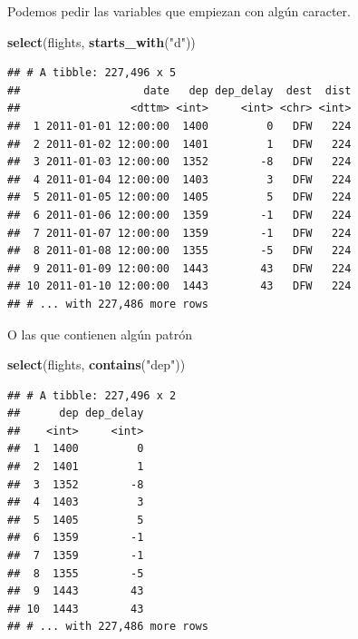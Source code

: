 \documentclass[]{article}
\newenvironment{Shaded}{\begin{snugshade}}{\end{snugshade}}
\newcommand{\KeywordTok}[1]{\textcolor[rgb]{0.13,0.29,0.53}{\textbf{#1}}}
\newcommand{\StringTok}[1]{\textcolor[rgb]{0.31,0.60,0.02}{#1}}
\newcommand{\NormalTok}[1]{#1}
\begin{document}
Podemos pedir las variables que empiezan con algún caracter.

\begin{Shaded}
\begin{Highlighting}[]
\KeywordTok{select}\NormalTok{(flights, }\KeywordTok{starts_with}\NormalTok{(}\StringTok{"d"}\NormalTok{))}
\end{Highlighting}
\end{Shaded}

\begin{verbatim}
## # A tibble: 227,496 x 5
##                   date   dep dep_delay  dest  dist
##                 <dttm> <int>     <int> <chr> <int>
##  1 2011-01-01 12:00:00  1400         0   DFW   224
##  2 2011-01-02 12:00:00  1401         1   DFW   224
##  3 2011-01-03 12:00:00  1352        -8   DFW   224
##  4 2011-01-04 12:00:00  1403         3   DFW   224
##  5 2011-01-05 12:00:00  1405         5   DFW   224
##  6 2011-01-06 12:00:00  1359        -1   DFW   224
##  7 2011-01-07 12:00:00  1359        -1   DFW   224
##  8 2011-01-08 12:00:00  1355        -5   DFW   224
##  9 2011-01-09 12:00:00  1443        43   DFW   224
## 10 2011-01-10 12:00:00  1443        43   DFW   224
## # ... with 227,486 more rows
\end{verbatim}

O las que contienen algún patrón

\begin{Shaded}
\begin{Highlighting}[]
\KeywordTok{select}\NormalTok{(flights, }\KeywordTok{contains}\NormalTok{(}\StringTok{"dep"}\NormalTok{))}
\end{Highlighting}
\end{Shaded}

\begin{verbatim}
## # A tibble: 227,496 x 2
##      dep dep_delay
##    <int>     <int>
##  1  1400         0
##  2  1401         1
##  3  1352        -8
##  4  1403         3
##  5  1405         5
##  6  1359        -1
##  7  1359        -1
##  8  1355        -5
##  9  1443        43
## 10  1443        43
## # ... with 227,486 more rows
\end{verbatim}

\renewcommand\bcStyleTitre[1]{\large\textcolor{bbblack}{#1}}
\end{document}
